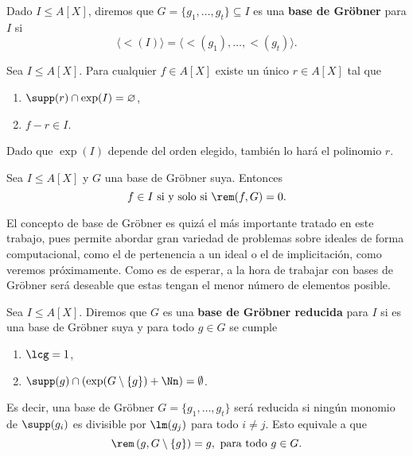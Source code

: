 \begin{definicion}
    Dado $I\le A[X]$, diremos que $G = \{g_1,\dots, g_t\}\subseteq I$ es una \textbf{base de Gröbner} para $I$ si 
    $$\langle \lt(I)\rangle = \langle \lt(g_1),\dots, \lt(g_t) \rangle.$$
\end{definicion}
\begin{proposicion}\label{p:unicoR}
    Sea $I\le A[X]$. Para cualquier $f\in A[X]$ existe un único $r\in A[X]$ tal que
    \begin{enumerate}
        \item $\supp(r)\cap \exp(I) = \varnothing$,
        \item $f-r\in I$.
    \end{enumerate}
\end{proposicion}
\begin{observacion}
    Dado que $\exp(I)$ depende del orden elegido, también lo hará el polinomio $r$.
\end{observacion}
\begin{corolario}\label{cor:redCero}
    Sea $I\le A[X]$ y $G$ una base de Gröbner suya. Entonces
    $$f\in I \text{ si y solo si } \rem(f,G)=0.$$
\end{corolario}
El concepto de base de Gröbner es quizá el más importante tratado en este trabajo, pues permite abordar gran variedad de problemas sobre ideales de forma computacional, como el de pertenencia a un ideal o el de implicitación, como veremos próximamente. Como es de esperar, a la hora de trabajar con bases de Gröbner será deseable que estas tengan el menor número de elementos posible.

\begin{definicion}
    Sea $I\le A[X]$. Diremos que $G$ es una \textbf{base de Gröbner reducida} para $I$ si es una base de Gröbner suya y para todo $g\in G$ se cumple
    \begin{enumerate}
        \item $\lcg=1$,
        \item $\supp(g) \cap \left(\exp(G\setminus\{g\}) + \Nn \right) = \emptyset$.
    \end{enumerate}
    Es decir, una base de Gröbner $G=\{g_1,\dots, g_t\}$ será reducida si ningún monomio de $\supp(g_i)$ es divisible por $\lm(g_j)$ para todo $i\neq j$. Esto equivale a que
    \begin{equation*}
        \rem\left(g, G\setminus \{g\}\right) = g,\ \text{para todo } g\in G.
    \end{equation*}
\end{definicion}

